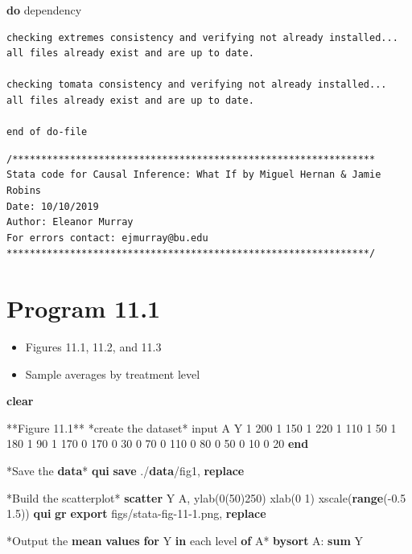 \documentclass[
  10pt,
]{book}
\newenvironment{Shaded}{\begin{snugshade}}{\end{snugshade}}
\newcommand{\BaseNTok}[1]{\textcolor[rgb]{0.00,0.00,0.81}{#1}}
\newcommand{\DecValTok}[1]{\textcolor[rgb]{0.00,0.00,0.81}{#1}}
\newcommand{\KeywordTok}[1]{\textcolor[rgb]{0.13,0.29,0.53}{\textbf{#1}}}
\newcommand{\NormalTok}[1]{#1}
\providecommand{\tightlist}{%
  \setlength{\itemsep}{0pt}\setlength{\parskip}{0pt}}
\begin{document}
\begin{Shaded}
\begin{Highlighting}[]
\KeywordTok{do}\NormalTok{ dependency}
\end{Highlighting}
\end{Shaded}

\begin{verbatim}
checking extremes consistency and verifying not already installed...
all files already exist and are up to date.

checking tomata consistency and verifying not already installed...
all files already exist and are up to date.

end of do-file
\end{verbatim}

\begin{verbatim}
/***************************************************************
Stata code for Causal Inference: What If by Miguel Hernan & Jamie Robins
Date: 10/10/2019
Author: Eleanor Murray 
For errors contact: ejmurray@bu.edu
***************************************************************/
\end{verbatim}

\hypertarget{program-11.1-1}{%
\section{Program 11.1}\label{program-11.1-1}}

\begin{itemize}
\tightlist
\item
  Figures 11.1, 11.2, and 11.3
\item
  Sample averages by treatment level
\end{itemize}

\begin{Shaded}
\begin{Highlighting}[]
\KeywordTok{clear}

\NormalTok{**Figure 11.1**}
\NormalTok{*create the dataset*}
\NormalTok{input A Y}
\NormalTok{1 200}
\NormalTok{1 150}
\NormalTok{1 220}
\NormalTok{1 110}
\NormalTok{1 50}
\NormalTok{1 180}
\NormalTok{1 90}
\NormalTok{1 170}
\NormalTok{0 170}
\NormalTok{0 30}
\NormalTok{0 70}
\NormalTok{0 110}
\NormalTok{0 80}
\NormalTok{0 50}
\NormalTok{0 10}
\NormalTok{0 20}
\KeywordTok{end}

\NormalTok{*Save the }\KeywordTok{data}\NormalTok{*}
\KeywordTok{qui} \KeywordTok{save}\NormalTok{ ./}\KeywordTok{data}\NormalTok{/fig1, }\KeywordTok{replace}

\NormalTok{*Build the scatterplot*}
\KeywordTok{scatter}\NormalTok{ Y A, ylab(0(50)250) xlab(0 1) }\BaseNTok{xscale}\NormalTok{(}\KeywordTok{range}\NormalTok{({-}0.5 1.5))}
\KeywordTok{qui} \KeywordTok{gr} \KeywordTok{export}\NormalTok{ figs/stata{-}fig{-}11{-}1.png, }\KeywordTok{replace}

\NormalTok{*Output the }\KeywordTok{mean} \KeywordTok{values} \KeywordTok{for}\NormalTok{ Y }\KeywordTok{in}\NormalTok{ each }\DecValTok{level} \KeywordTok{of}\NormalTok{ A*}
\KeywordTok{bysort}\NormalTok{ A: }\KeywordTok{sum}\NormalTok{ Y}
\end{Highlighting}
\end{Shaded}
\end{document}
